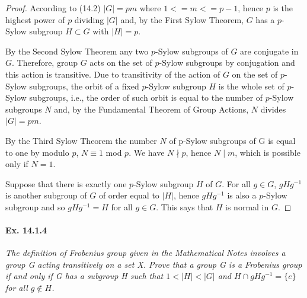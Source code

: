 \documentclass[11pt,a4paper]{article}
\begin{document}
\begin{proof}
According to (14.2) $|G|=pm$ where $1<=m<=p-1$, hence $p$ is the highest power of $p$ dividing $|G|$ and, by the First Sylow Theorem, $G$ has a $p$-Sylow subgroup $H\subset G$ with $|H|=p$.

By the Second Sylow Theorem any two $p$-Sylow subgroups of $G$ are conjugate in $G$. Therefore, group $G$ acts on the set of $p$-Sylow subgroups by conjugation and this action is transitive. Due to transitivity of the action of $G$ on the set of $p$-Sylow subgroups, the orbit of a fixed $p$-Sylow subgroup $H$ is the whole set of $p$-Sylow subgroups, i.e., the order of such orbit is equal to the number of $p$-Sylow subgroups $N$ and, by the Fundamental Theorem of Group Actions, $N$ divides $|G|=pm$.

By the Third Sylow Theorem the number $N$ of p-Sylow subgroups of G is equal to one by modulo $p$, $N\equiv 1$ mod $p$. We have $N\nmid p$, hence $N \mid m$, which is possible only if $N=1$.

Suppose that there is exactly one $p$-Sylow subgroup $H$ of $G$.
For all $g \in G$, $gHg^{-1}$ is another subgroup of $G$ of order equal to $|H|$, hence $gHg^{-1}$
is also a $p$-Sylow subgroup and so $gHg^{-1}=H$ for all
$g \in G$. This says that $H$ is normal in $G$.

\end{proof}

\paragraph{Ex. 14.1.4}

{\it The definition of Frobenius group given in the Mathematical Notes involves a group G acting transitively on a set X. Prove that a group G is a Frobenius group if and only if G has a subgroup H such that $1<|H|<|G|$ and $H\cap gHg^{-1}=\{e\}$ for all $g \notin H$.
}
\end{document}
